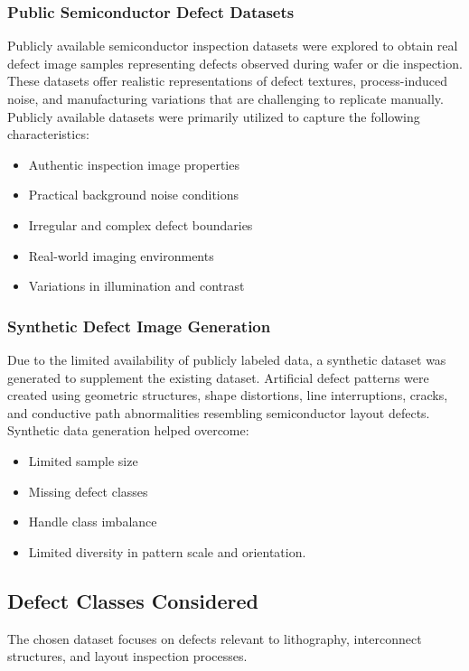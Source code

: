 \subsubsection{Public Semiconductor Defect Datasets}
Publicly available semiconductor inspection datasets were explored to obtain real defect image samples representing defects observed during wafer or die inspection. These datasets offer realistic representations of defect textures, process-induced noise, and manufacturing variations that are challenging to replicate manually. Publicly available datasets were primarily utilized to capture the following characteristics:

\begin{itemize}
\item Authentic inspection image properties
\item Practical background noise conditions
\item Irregular and complex defect boundaries
\item Real-world imaging environments
\item Variations in illumination and contrast
\end{itemize}

\subsubsection{Synthetic Defect Image Generation}
Due to the limited availability of publicly labeled data, a synthetic dataset was generated to supplement the existing dataset. Artificial defect patterns were created using geometric structures, shape distortions, line interruptions, cracks, and conductive path abnormalities resembling semiconductor layout defects.
Synthetic data generation helped overcome:
\begin{itemize}
    \item Limited sample size
    \item Missing defect classes
    \item Handle class imbalance
    \item Limited diversity in pattern scale and orientation.
\end{itemize}

\subsection{Defect Classes Considered}
The chosen dataset focuses on defects relevant to lithography, interconnect structures, and layout inspection processes.

